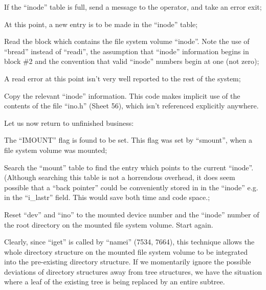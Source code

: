 \item[7309:] If the  ``inode''  table  is  full,
      send  a  message to the operator,
      and take an error exit;

\item[7314:] At this point, a new entry is  to
      be made in the ``inode'' table;

\item[7319:] Read the block which contains the
      file  system volume ``inode''. Note
      the use  of  ``bread''  instead  of
      ``readi'',   the   assumption  that
      ``inode''  information  begins   in
      block \#2  and the convention that
      valid ``inode''  numbers  begin  at
      one (not zero);

\item[7326:] A read error at this point isn't
      very well reported to the rest of       
      the system; 

\item[7328:] Copy the relevant ``inode'' 
information.  This code makes implicit
      use of the contents of  the  file
      ``ino.h''  (Sheet  56), which isn't
      referenced explicitly anywhere.
\ed

\noindent Let us now return to  unfinished  business:

\bd
\item[7292:] The ``IMOUNT'' flag is found to  be
      set.   This   flag   was  set  by
``smount'',  when  a  file   system
volume was mounted;

\item[7293:] Search the ``mount'' table to  find
      the  entry  which  points  to the
      current    ``inode''.     (Although
      searching  this  table  is  not a
      horrendous overhead, it does seem
      possible  that  a  ``back pointer''
      could be conveniently  stored  in
      in   the   ``inode''  e.g.  in  the
      ``i\_lastr'' field. This would  save
      both time and code space.;

\item[7396:] Reset  ``dev''  and  ``ino''  to  the
      mounted  device  number  and  the
      ``inode'' number of the root directory  on  the mounted file system
      volume.  Start again.
\ed


Clearly,  since  ``iget''  is  called  by
``namei''  (7534,  7664),  this technique
allows the whole directory structure on
the  mounted  file  system volume to be
integrated into the pre-existing directory   structure.   If  we  momentarily
ignore  the  possible   deviations   of
directory  structures  away  from  tree
structures, we have the situation where
a  leaf  of  the existing tree is being
replaced by an entire subtree.


